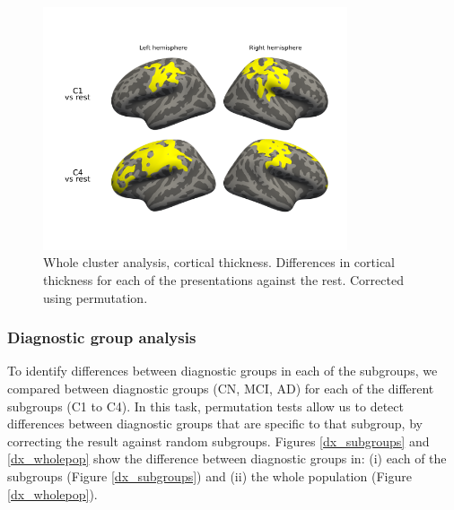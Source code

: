 \begin{figure}[!htbp]
\centering
\includegraphics[width=0.8\textwidth]{figures/cimlr/ex1_cort.png}
\caption[Whole cluster analysis, cortical thickness.]{Whole cluster analysis, cortical thickness. Differences in cortical thickness for each of the presentations against the rest. Corrected using permutation.}
\label{cluster_against_others_cort}
\end{figure}

\subsubsection{Diagnostic group analysis}

To identify differences between diagnostic groups in each of the subgroups, we compared between diagnostic groups (CN, MCI, AD) for each of the different subgroups (C1 to C4). In this task, permutation tests allow us to detect differences between diagnostic groups that are specific to that subgroup, by correcting the result against random subgroups. Figures \ref{dx_subgroups} and \ref{dx_wholepop} show the difference between diagnostic groups in: (i) each of the subgroups (Figure \ref{dx_subgroups}) and (ii) the whole population (Figure \ref{dx_wholepop}). \\


